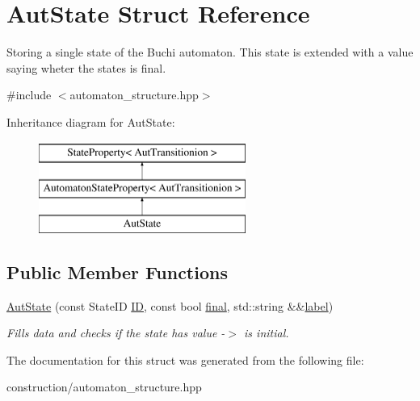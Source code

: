 \hypertarget{structAutState}{\section{\-Aut\-State \-Struct \-Reference}
\label{structAutState}
}


\-Storing a single state of the \-Buchi automaton. \-This state is extended with a value saying wheter the states is final.  




{\ttfamily \#include $<$automaton\-\_\-structure.\-hpp$>$}

\-Inheritance diagram for \-Aut\-State\-:\begin{figure}[H]
\begin{center}
\leavevmode
\includegraphics[height=3.000000cm]{structAutState}
\end{center}
\end{figure}
\subsection*{\-Public \-Member \-Functions}
\begin{DoxyCompactItemize}
\item 
\hypertarget{structAutState_a6cc8e67981514be7120c2e4963e63ee6}{\hyperlink{structAutState_a6cc8e67981514be7120c2e4963e63ee6}{\-Aut\-State} (const \-State\-I\-D \hyperlink{structStateProperty_af33be20c9033f9b6524c0447e7ac647e}{\-I\-D}, const bool \hyperlink{structAutomatonStateProperty_aa95898834a149d202575a6f655a5e5e2}{final}, std\-::string \&\&\hyperlink{structStateProperty_a7cfb634f80b68196eefa54e8ee98a5fe}{label})}\label{structAutState_a6cc8e67981514be7120c2e4963e63ee6}

\begin{DoxyCompactList}\small\item\em \-Fills data and checks if the state has value -\/$>$ is initial. \end{DoxyCompactList}\end{DoxyCompactItemize}


\-The documentation for this struct was generated from the following file\-:\begin{DoxyCompactItemize}
\item 
construction/automaton\-\_\-structure.\-hpp\end{DoxyCompactItemize}
